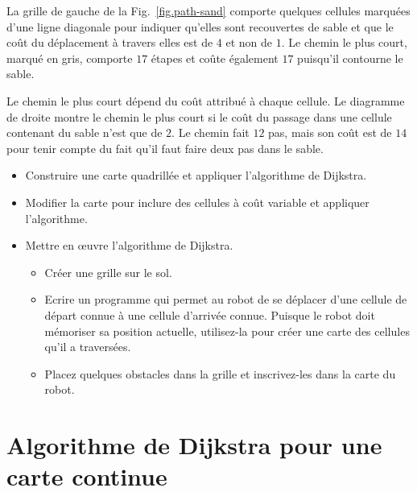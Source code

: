 La grille de gauche de la Fig.~\ref{fig.path-sand} comporte quelques cellules marquées d'une ligne diagonale pour indiquer qu'elles sont recouvertes de sable et que le coût du déplacement à travers elles est de $4$ et non de $1$. Le chemin le plus court, marqué en gris, comporte $17$ étapes et coûte également $17$ puisqu'il contourne le sable.

Le chemin le plus court dépend du coût attribué à chaque cellule. Le diagramme de droite montre le chemin le plus court si le coût du passage dans une cellule contenant du sable n'est que de $2$. Le chemin fait $12$ pas, mais son coût est de $14$ pour tenir compte du fait qu'il faut faire deux pas dans le sable.

\begin{framed}
\begin{itemize}
\item Construire une carte quadrillée et appliquer l'algorithme de Dijkstra.
\item Modifier la carte pour inclure des cellules à coût variable et appliquer l'algorithme.
\item Mettre en œuvre l'algorithme de Dijkstra.
\begin{itemize}
\item Créer une grille sur le sol.
\item Ecrire un programme qui permet au robot de se déplacer d'une cellule de départ connue à une cellule d'arrivée connue. Puisque le robot doit mémoriser sa position actuelle, utilisez-la pour créer une carte des cellules qu'il a traversées.
\item Placez quelques obstacles dans la grille et inscrivez-les dans la carte du robot.
\end{itemize}
\end{itemize}
\end{framed}

\section{Algorithme de Dijkstra pour une carte continue}\label{s.dijkstra-continuous}

